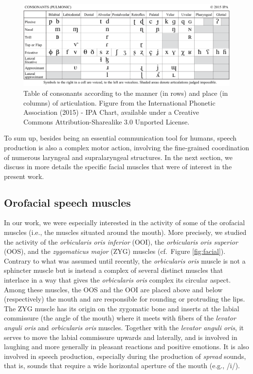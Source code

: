 \documentclass[a4paper,12pt,twoside,onecolumn,openright,final,oldfontcommands]{memoir}
\begin{document}
\begin{figure}[ht]

{\centering \includegraphics[width=1\linewidth]{assets/consonants} 

}

\caption{Table of consonants according to the manner (in rows) and place (in columns) of articulation. Figure from the International Phonetic Association (2015) - IPA Chart, available under a Creative Commons Attribution-Sharealike 3.0 Unported License.}\label{fig:consonants}
\end{figure}

To sum up, besides being an essential communication tool for humans, speech production is also a complex motor action, involving the fine-grained coordination of numerous laryngeal and supralaryngeal structures. In the next section, we discuss in more details the specific facial muscles that were of interest in the present work.

\hypertarget{orofacial-speech-muscles}{%
\subsection{Orofacial speech muscles}\label{orofacial-speech-muscles}}

In our work, we were especially interested in the activity of some of the orofacial muscles (i.e., the muscles situated around the mouth). More precisely, we studied the activity of the \emph{orbicularis oris inferior} (OOI), the \emph{orbicularis oris superior} (OOS), and the \emph{zygomaticus major} (ZYG) muscles (cf.~Figure \ref{fig:facial}). Contrary to what was assumed until recently, the \emph{orbicularis oris} muscle is not a sphincter muscle but is instead a complex of several distinct muscles that interlace in a way that gives the \emph{orbicularis oris} complex its circular aspect. Among these muscles, the OOS and the OOI are placed above and below (respectively) the mouth and are responsible for rounding or protruding the lips. The ZYG muscle has its origin on the zygomatic bone and inserts at the labial commissure (the angle of the mouth) where it meets with fibers of the \emph{levator anguli oris} and \emph{orbicularis oris} muscles. Together with the \emph{levator anguli oris}, it serves to move the labial commissure upwards and laterally, and is involved in laughing and more generally in pleasant reactions and positive emotions. It is also involved in speech production, especially during the production of \emph{spread} sounds, that is, sounds that require a wide horizontal aperture of the mouth (e.g., /i/).
\end{document}
